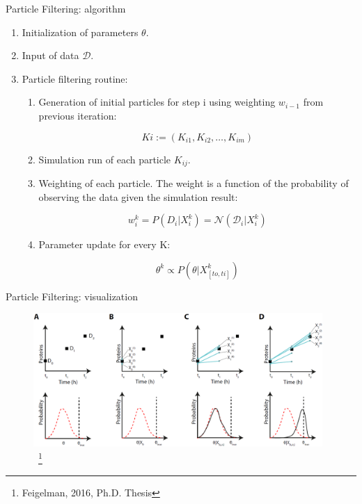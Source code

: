 \documentclass[pdf]
{beamer}
\begin{document}
\begin{frame}{Particle Filtering: algorithm}
	\begin{enumerate}
		\item Initialization of parameters $\theta$.
		\item Input of data $\mathcal{D}$.
		\item Particle filtering routine:

		\begin{enumerate}
			\item Generation of initial particles for step i using weighting $w_{i-1}$ from previous iteration:
			
			\begin{equation}
				Ki := (K_{i1}, K_{i2}, \dots, K_{im})
			\end{equation}

			\item Simulation run of each particle $K_{ij}$.
			\item Weighting of each particle. The weight is a function of the probability of observing the data given the simulation result:

			\begin{equation}
				w_i^k = P(D_i | X_i^k) = \mathcal{N}(\mathcal{D}_i | X_i^k)
			\end{equation}

			\item Parameter update for every K:

			\begin{equation}
				\theta^k \propto P(\theta | X^k_{[to, ti]})
			\end{equation}

		\end{enumerate}

	\end{enumerate}
\end{frame}

\begin{frame}{Particle Filtering: visualization}
	\begin{figure}[ht]
		\begin{center}
			\includegraphics[height=2in]{figures/particle_filtering.png}
			~\footnote{Feigelman, 2016, Ph.D. Thesis}
		\end{center}
	\end{figure}
\end{frame}
\end{document}
